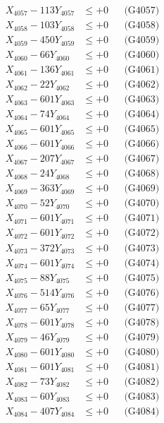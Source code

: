 \documentclass[a4paper,10pt]{article}
\begin{document}
{\begin{align}
X_{4057} - 113Y_{4057} &\leq +0 && \text{(G4057)} \\
X_{4058} - 103Y_{4058} &\leq +0 && \text{(G4058)} \\
X_{4059} - 450Y_{4059} &\leq +0 && \text{(G4059)} \\
X_{4060} - 66Y_{4060} &\leq +0 && \text{(G4060)} \\
\allowbreak
X_{4061} - 136Y_{4061} &\leq +0 && \text{(G4061)} \\
X_{4062} - 22Y_{4062} &\leq +0 && \text{(G4062)} \\
X_{4063} - 601Y_{4063} &\leq +0 && \text{(G4063)} \\
X_{4064} - 74Y_{4064} &\leq +0 && \text{(G4064)} \\
X_{4065} - 601Y_{4065} &\leq +0 && \text{(G4065)} \\
X_{4066} - 601Y_{4066} &\leq +0 && \text{(G4066)} \\
X_{4067} - 207Y_{4067} &\leq +0 && \text{(G4067)} \\
X_{4068} - 24Y_{4068} &\leq +0 && \text{(G4068)} \\
X_{4069} - 363Y_{4069} &\leq +0 && \text{(G4069)} \\
X_{4070} - 52Y_{4070} &\leq +0 && \text{(G4070)} \\
\allowbreak
X_{4071} - 601Y_{4071} &\leq +0 && \text{(G4071)} \\
X_{4072} - 601Y_{4072} &\leq +0 && \text{(G4072)} \\
X_{4073} - 372Y_{4073} &\leq +0 && \text{(G4073)} \\
X_{4074} - 601Y_{4074} &\leq +0 && \text{(G4074)} \\
X_{4075} - 88Y_{4075} &\leq +0 && \text{(G4075)} \\
X_{4076} - 514Y_{4076} &\leq +0 && \text{(G4076)} \\
X_{4077} - 65Y_{4077} &\leq +0 && \text{(G4077)} \\
X_{4078} - 601Y_{4078} &\leq +0 && \text{(G4078)} \\
X_{4079} - 46Y_{4079} &\leq +0 && \text{(G4079)} \\
X_{4080} - 601Y_{4080} &\leq +0 && \text{(G4080)} \\
\allowbreak
X_{4081} - 601Y_{4081} &\leq +0 && \text{(G4081)} \\
X_{4082} - 73Y_{4082} &\leq +0 && \text{(G4082)} \\
X_{4083} - 60Y_{4083} &\leq +0 && \text{(G4083)} \\
X_{4084} - 407Y_{4084} &\leq +0 && \text{(G4084)} \\

\end{align}}
\end{document}
